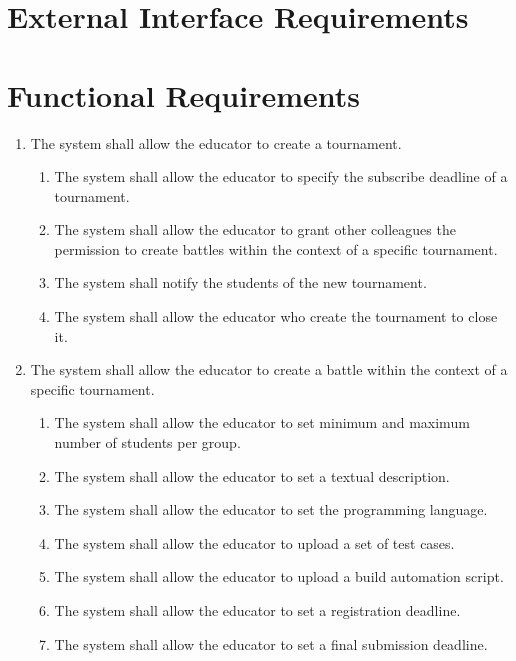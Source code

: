 \section{External Interface Requirements}
\section{Functional Requirements}

\begin{enumerate}[label=\textbf{R\arabic*}:,leftmargin=1.3cm]
    \item The system shall allow the educator to create a tournament.
          \begin{enumerate}[label=\textbf{R\arabic{enumi}.\arabic*}:, leftmargin=*]
              \item The system shall allow the educator to specify the subscribe deadline of a tournament.
              \item The system shall allow the educator to grant other colleagues the permission to create battles within the context of a specific tournament.
              \item The system shall notify the students of the new tournament.
              \item The system shall allow the educator who create the tournament to close it.
          \end{enumerate}
    \item The system shall allow the educator to create a battle within the context of a specific tournament.
          \begin{enumerate}[label=\textbf{R\arabic{enumi}.\arabic*}:, leftmargin=*]
              \item The system shall allow the educator to set minimum and maximum number of students per group.
              \item The system shall allow the educator to set a textual description.
              \item The system shall allow the educator to set the programming language.
              \item The system shall allow the educator to upload a set of test cases.
              \item The system shall allow the educator to upload a build automation script.
              \item The system shall allow the educator to set a registration deadline.
              \item The system shall allow the educator to set a final submission deadline.

\end{enumerate}
\end{enumerate}
